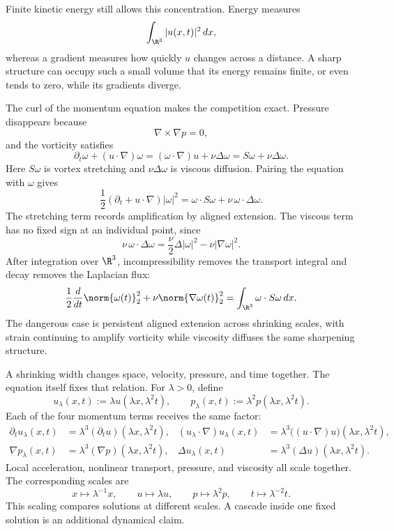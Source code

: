 Finite kinetic energy still allows this concentration.
Energy measures
\[
  \int_{\R^3}|u(x,t)|^2\,dx,
\]
whereas a gradient measures how quickly \(u\) changes across a distance.
A sharp structure can occupy such a small volume that its energy remains finite, or even tends to zero, while its gradients diverge.

The curl of the momentum equation makes the competition exact.
Pressure disappears because
\[
  \nabla\times\nabla p=0,
\]
and the vorticity satisfies
\[
  \partial_t\omega+(u\cdot\nabla)\omega
  =
  (\omega\cdot\nabla)u+\nu\Delta\omega
  =
  S\omega+\nu\Delta\omega.
\]
Here \(S\omega\) is vortex stretching and \(\nu\Delta\omega\) is viscous diffusion.
Pairing the equation with \(\omega\) gives
\[
  \frac12(\partial_t+u\cdot\nabla)|\omega|^2
  =
  \omega\cdot S\omega
  +
  \nu\,\omega\cdot\Delta\omega.
\]
The stretching term records amplification by aligned extension.
The viscous term has no fixed sign at an individual point, since
\[
  \nu\,\omega\cdot\Delta\omega
  =
  \frac{\nu}{2}\Delta|\omega|^2
  -
  \nu|\nabla\omega|^2.
\]
After integration over \(\R^3\), incompressibility removes the transport integral and decay removes the Laplacian flux:
\[
  \frac12\frac{d}{dt}\norm{\omega(t)}_2^2
  +
  \nu\norm{\nabla\omega(t)}_2^2
  =
  \int_{\R^3}\omega\cdot S\omega\,dx.
\]
The dangerous case is persistent aligned extension across shrinking scales, with strain continuing to amplify vorticity while viscosity diffuses the same sharpening structure.


A shrinking width changes space, velocity, pressure, and time together.
The equation itself fixes that relation.
For \(\lambda>0\), define
\[
  u_\lambda(x,t)
  :=
  \lambda u(\lambda x,\lambda^2t),
  \qquad
  p_\lambda(x,t)
  :=
  \lambda^2p(\lambda x,\lambda^2t).
\]
Each of the four momentum terms receives the same factor:
\[
\begin{aligned}
  \partial_t u_\lambda(x,t)
  &=
  \lambda^3(\partial_t u)(\lambda x,\lambda^2t),
  &
  (u_\lambda\cdot\nabla)u_\lambda(x,t)
  &=
  \lambda^3\bigl((u\cdot\nabla)u\bigr)(\lambda x,\lambda^2t),
  \\
  \nabla p_\lambda(x,t)
  &=
  \lambda^3(\nabla p)(\lambda x,\lambda^2t),
  &
  \Delta u_\lambda(x,t)
  &=
  \lambda^3(\Delta u)(\lambda x,\lambda^2t).
\end{aligned}
\]
Local acceleration, nonlinear transport, pressure, and viscosity all scale together.
The corresponding scales are
\[
  x\mapsto\lambda^{-1}x,
  \qquad
  u\mapsto\lambda u,
  \qquad
  p\mapsto\lambda^2p,
  \qquad
  t\mapsto\lambda^{-2}t.
\]
This scaling compares solutions at different scales.
A cascade inside one fixed solution is an additional dynamical claim.

